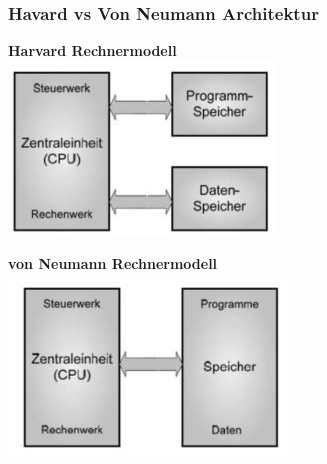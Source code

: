 \subsubsection{Havard vs Von Neumann Architektur}
\begin{multicols}{2}
    \begin{minipage}{\linewidth}
        \textbf{Harvard Rechnermodell}\\
        \includegraphics[width=0.6\linewidth]{images/HavardArchi}
    \end{minipage}
    
    \begin{minipage}{\linewidth}
        \textbf{von Neumann Rechnermodell}\\
        \includegraphics[width=0.6\linewidth]{images/NeumannArchi}
    \end{minipage}
\end{multicols}
\clearpage
